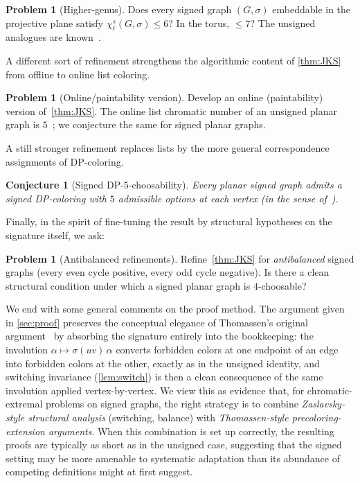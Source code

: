 \documentclass[11pt,a4paper]{article}
\theoremstyle{plain}
\newtheorem{conjecture}[theorem]{Conjecture}
\theoremstyle{definition}
\newtheorem{problem}[theorem]{Problem}
\newcommand{\chs}{\chi_{\ell}^{s}}
\newcommand{\Gs}{(G,\sigma)}
\begin{document}
\begin{problem}[Higher-genus]
Does every signed graph $\Gs$ embeddable in the projective plane
satisfy $\chs\Gs\le 6$? In the torus, $\le 7$? The unsigned
analogues are known~\cite{ChoiKierstead2019,DeVosKawarabayashiMohar2008,BohmeMS1999,Skrekovski2002}.
\end{problem}

A different sort of refinement strengthens the algorithmic content
of \cref{thm:JKS} from offline to online list coloring.

\begin{problem}[Online/paintability version]
Develop an online (paintability) version of~\cref{thm:JKS}. The
online list chromatic number of an unsigned planar graph is
$5$~\cite{Schauz2009}; we conjecture the same for signed planar
graphs.
\end{problem}

A still stronger refinement replaces lists by the more general
correspondence assignments of DP-coloring.

\begin{conjecture}[Signed DP-$5$-choosability]\label{conj:DP}
Every planar signed graph admits a signed DP-coloring with $5$
admissible options at each vertex (in the sense
of~\cite{JinKangSteffen2018}).
\end{conjecture}

Finally, in the spirit of fine-tuning the result by structural
hypotheses on the signature itself, we ask:

\begin{problem}[Antibalanced refinements]
Refine~\cref{thm:JKS} for \emph{antibalanced} signed graphs (every
even cycle positive, every odd cycle negative). Is there a clean
structural condition under which a signed planar graph is
$4$-choosable?
\end{problem}

We end with some general comments on the proof method. The
argument given in \cref{sec:proof} preserves the conceptual
elegance of Thomassen's original argument~\cite{Thomassen1994} by
absorbing the signature entirely into the bookkeeping: the
involution $\alpha\mapsto\sigma(uv)\,\alpha$ converts forbidden
colors at one endpoint of an edge into forbidden colors at the
other, exactly as in the unsigned identity, and switching invariance
(\cref{lem:switch}) is then a clean consequence of the same
involution applied vertex-by-vertex. We view this as evidence that,
for chromatic-extremal problems on signed graphs, the right strategy
is to combine \emph{Zaslavsky-style structural analysis} (switching,
balance) with \emph{Thomassen-style precoloring-extension arguments}.
When this combination is set up correctly, the resulting proofs
are typically as short as in the unsigned case, suggesting that the
signed setting may be more amenable to systematic adaptation than
its abundance of competing definitions might at first suggest.
\end{document}

